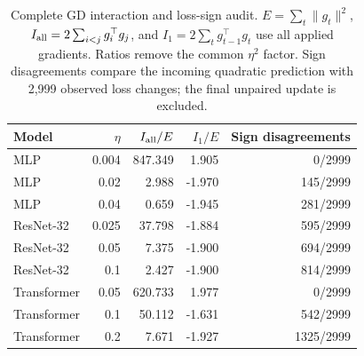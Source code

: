 \begin{table}[!t]
\caption{Complete GD interaction and loss-sign audit. $E=\sum_t\|g_t\|^2$, $I_{\rm all}=2\sum_{i<j}g_i^\top g_j$, and $I_1=2\sum_tg_{t-1}^\top g_t$ use all applied gradients. Ratios remove the common $\eta^2$ factor. Sign disagreements compare the incoming quadratic prediction with 2,999 observed loss changes; the final unpaired update is excluded.}
\label{tab:app-gd-audit}
\centering\footnotesize
\setlength{\tabcolsep}{3pt}
\begin{tabular}{lrrrr}
\toprule
Model & $\eta$ & $I_{\rm all}/E$ & $I_1/E$ & Sign disagreements \\
\midrule
MLP & 0.004 & 847.349 & 1.905 & 0/2999 \\
MLP & 0.02 & 2.988 & -1.970 & 145/2999 \\
MLP & 0.04 & 0.659 & -1.945 & 281/2999 \\
ResNet-32 & 0.025 & 37.798 & -1.884 & 595/2999 \\
ResNet-32 & 0.05 & 7.375 & -1.900 & 694/2999 \\
ResNet-32 & 0.1 & 2.427 & -1.900 & 814/2999 \\
Transformer & 0.05 & 620.733 & 1.977 & 0/2999 \\
Transformer & 0.1 & 50.112 & -1.631 & 542/2999 \\
Transformer & 0.2 & 7.671 & -1.927 & 1325/2999 \\
\bottomrule
\end{tabular}
\end{table}
